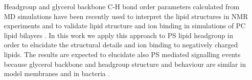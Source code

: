 \documentclass[aps,prl,superscriptaddress,twocolumn]{revtex4}
\begin{document}


Headgroup and glycerol backbone C-H bond order parameters
calculated from MD simulations have been
recently used to interpret the lipid structures in NMR experiments
and to validate lipid structure and ion binding in simulations of
PC lipid bilayers \cite{botan15,catte16,ollila16,ferreira16}.
In this work we apply this approach to PS lipid headgroup
in order to elucidate the structural details and ion binding
to negatively charged lipids. The results are expected to elucidate
also PS mediated signalling events because 
glycerol backbone and headgroup structure and behaviour are similar
in model membranes and in bacteria \cite{gally81,scherer87,seelig90}.








\end{document}
